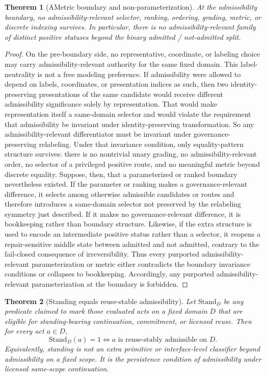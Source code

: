 \documentclass[11pt]{article}
\newtheorem{theorem}{Theorem}[section]
\theoremstyle{definition}
\theoremstyle{remark}
\begin{document}
\begin{theorem}[AMetric boundary and non-parameterization]\label{thm:ametric}
At the admissibility boundary, no admissibility-relevant selector, ranking, ordering, grading, metric, or discrete indexing survives. In particular, there is no admissibility-relevant family of distinct positive statuses beyond the binary admitted / not-admitted split.
\end{theorem}

\begin{proof}
On the pre-boundary side, no representative, coordinate, or labeling choice may carry admissibility-relevant authority for the same fixed domain. This label-neutrality is not a free modeling preference. If admissibility were allowed to depend on labels, coordinates, or presentation indices as such, then two identity-preserving presentations of the same candidate would receive different admissibility significance solely by representation. That would make representation itself a same-domain selector and would violate the requirement that admissibility be invariant under identity-preserving transformation. So any admissibility-relevant differentiator must be invariant under governance-preserving relabeling. Under that invariance condition, only equality-pattern structure survives: there is no nontrivial unary grading, no admissibility-relevant order, no selector of a privileged positive route, and no meaningful metric beyond discrete equality. Suppose, then, that a parameterized or ranked boundary nevertheless existed. If the parameter or ranking makes a governance-relevant difference, it selects among otherwise admissible candidates or routes and therefore introduces a same-domain selector not preserved by the relabeling symmetry just described. If it makes no governance-relevant difference, it is bookkeeping rather than boundary structure. Likewise, if the extra structure is used to encode an intermediate positive status rather than a selector, it reopens a repair-sensitive middle state between admitted and not admitted, contrary to the fail-closed consequence of irreversibility. Thus every purported admissibility-relevant parameterization or metric either contradicts the boundary invariance conditions or collapses to bookkeeping. Accordingly, any purported admissibility-relevant parameterization at the boundary is forbidden.
\end{proof}

\begin{theorem}[Standing equals reuse-stable admissibility]\label{thm:standing-reuse}
Let $\mathrm{Stand}_D$ be any predicate claimed to mark those evaluated acts on a fixed domain $D$ that are eligible for standing-bearing continuation, commitment, or licensed reuse. Then for every act $a \in D$,
\[
\mathrm{Stand}_D(a)=1 \iff a \text{ is reuse-stably admissible on } D.
\]
Equivalently, standing is not an extra primitive or interface-level classifier beyond admissibility on a fixed scope. It is the persistence condition of admissibility under licensed same-scope continuation.
\end{theorem}
\end{document}
